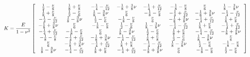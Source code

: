 \documentclass{instrukcja}
\begin{document}
\begin{displaymath}
 K = \frac{E}{1-\nu^2} \left[ \begin{tabular}{c c c c c c c c} $\frac{1}{2} - \frac{\nu}{6}$ & $\frac{1}{8} + \frac{\nu}{8}$ & $-\frac{1}{4} - \frac{\nu}{12}$ & $-\frac{1}{8} + \frac{3}{8}\nu$ & $-\frac{1}{4} + \frac{\nu}{12}$ & $-\frac{1}{8} - \frac{\nu}{8}$ & $\frac{\nu}{6}$ & $\frac{1}{8} - \frac{3}{8}\nu$ \\
$\frac{1}{8} + \frac{\nu}{8}$ & $\frac{1}{2} - \frac{\nu}{6}$ & $\frac{1}{8} - \frac{3}{8}\nu$ & $\frac{\nu}{6}$ & $-\frac{1}{8} - \frac{\nu}{8}$ & $-\frac{1}{4} + \frac{\nu}{12}$ & $-\frac{1}{8} + \frac{3}{8}\nu$ & $-\frac{1}{4} - \frac{\nu}{12}$ \\
$-\frac{1}{4} - \frac{\nu}{12}$ & $\frac{1}{8} - \frac{3}{8}\nu$ & $\frac{1}{2} - \frac{\nu}{6}$ & $-\frac{1}{8} - \frac{\nu}{8}$ & $\frac{\nu}{6}$ & $-\frac{1}{8} + \frac{3}{8}\nu$ & $-\frac{1}{4} + \frac{\nu}{12}$ & $\frac{1}{8} + \frac{\nu}{8}$ \\
$-\frac{1}{8} + \frac{3}{8}\nu$ & $\frac{\nu}{6}$ & $-\frac{1}{8} - \frac{\nu}{8}$ & $\frac{1}{2} - \frac{\nu}{6}$ & $\frac{1}{8} - \frac{3}{8}\nu$ & $-\frac{1}{4} - \frac{\nu}{12}$ & $\frac{1}{8} + \frac{\nu}{8}$ & $-\frac{1}{4} + \frac{\nu}{12}$ \\
$-\frac{1}{4} + \frac{\nu}{12}$ & $-\frac{1}{8} - \frac{\nu}{8}$ & $\frac{\nu}{6}$ & $\frac{1}{8} - \frac{3}{8}\nu$ & $\frac{1}{2} - \frac{\nu}{6}$ & $\frac{1}{8} + \frac{\nu}{8}$ & $-\frac{1}{4} - \frac{\nu}{12}$ & $-\frac{1}{8} + \frac{3}{8}\nu$ \\
$-\frac{1}{8} - \frac{\nu}{8}$ & $-\frac{1}{4} + \frac{\nu}{12}$ & $-\frac{1}{8} + \frac{3}{8}\nu$ & $-\frac{1}{4} - \frac{\nu}{12}$ & $\frac{1}{8} + \frac{\nu}{8}$ & $\frac{1}{2} - \frac{\nu}{6}$ & $\frac{1}{8} - \frac{3}{8}\nu$ & $\frac{\nu}{6}$ \\
$\frac{\nu}{6}$ & $-\frac{1}{8} + \frac{3}{8}\nu$ & $-\frac{1}{4} + \frac{\nu}{12}$ & $\frac{1}{8} + \frac{\nu}{8}$ & $-\frac{1}{4} - \frac{\nu}{12}$ & $\frac{1}{8} - \frac{3}{8}\nu$ & $\frac{1}{2} - \frac{\nu}{6}$ & $-\frac{1}{8} - \frac{\nu}{8}$ \\
$\frac{1}{8} - \frac{3}{8}\nu$ & $-\frac{1}{4} - \frac{\nu}{12}$ & $\frac{1}{8} + \frac{\nu}{8}$ & $-\frac{1}{4} + \frac{\nu}{12}$ & $-\frac{1}{8} + \frac{3}{8}\nu$ & $\frac{\nu}{6}$ & $-\frac{1}{8} - \frac{\nu}{8}$ & $\frac{1}{2} - \frac{\nu}{6}$ \\ \end{tabular} \right]
\end{displaymath}
\end{document}
